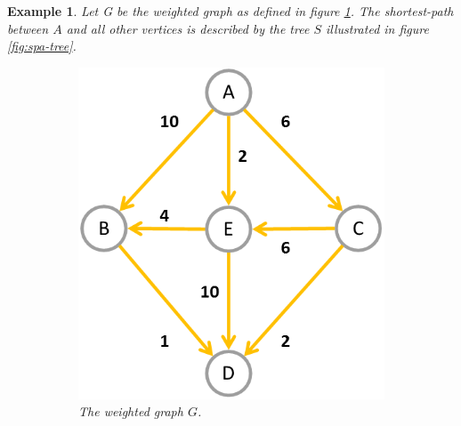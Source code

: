 \documentclass[12pt]{report}
\newtheorem{example}{Example}[section]
\begin{document}
\begin{example}
	Let G be the weighted graph as defined in figure \ref{fig:spa-graph}. The shortest-path between $A$ and all other vertices is described by the tree $S$ illustrated in figure \ref{fig:spa-tree}.

	\begin{figure}[H]
		\centering
		\begin{subfigure}{.4\linewidth}
			\includegraphics[width=\linewidth]{graphs/spa-graph}
			\captionsetup{justification=centering}
			\caption{The weighted graph $G$.}
			\label{fig:spa-graph}
		\end{subfigure}
		\begin{subfigure}{.4\linewidth}

\end{subfigure}
\end{figure}
\end{example}
\end{document}
